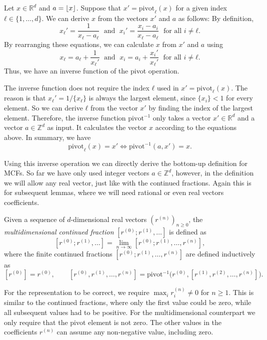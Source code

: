 Let $x ∈ ℝ^d$ and $a = \left\lfloor x\right\rfloor$.
Suppose that $x' = \mathrm{pivot}_ℓ(x)$ for a given index $ℓ ∈ \{1, …, d\}$.
We can derive $x$ from the vectors $x'$ and $a$ as follows:
By definition,
\[
  x_ℓ' = \frac{1}{x_ℓ - a_ℓ}
  \; \text{ and } \;
  x_i' = \frac{x_i - a_i}{x_ℓ - a_ℓ}
  \; \text{ for all } i ≠ ℓ.
\]
By rearranging these equations, we can calculate $x$ from $x'$ and $a$ using
\[
  x_ℓ = a_ℓ + \frac{1}{x_ℓ'}
  \; \text{ and } \;
  x_i = a_i + \frac{x_i'}{x_ℓ'}
  \; \text{ for all } i ≠ ℓ.
\]
Thus, we have an inverse function of the pivot operation.

The inverse function does not require the index $ℓ$ used in $x' = \mathrm{pivot}_ℓ(x)$.
The reason is that $x_ℓ' = 1/\{x_ℓ\}$ is always the largest element, since $\{x_i\} < 1$ for every element.
So we can derive $ℓ$ from the vector $x'$ by finding the index of the largest element.
Therefore, the inverse function $\mathrm{pivot}^{-1}$ only takes
a vector $x' ∈ ℝ^d$ and a vector $a ∈ ℤ^d$ as input.
It calculates the vector $x$ according to the equations above.
In summary, we have
\[
  \mathrm{pivot}_ℓ(x) = x' \iff \mathrm{pivot}^{-1}(a, x') = x.
\]

Using this inverse operation we can directly derive the bottom-up definition for MCFs.
So far we have only used integer vectors $a ∈ ℤ^d$,
however, in the definition we will allow any real vector, just like with the continued fractions.
Again this is for subsequent lemmas, where we will need rational or even real vectors coefficients.

\begin{definition}
  Given a sequence of $d$-dimensional real vectors $(r^{(n)})_{n ≥ 0}$,
  the \emph{multidimensional continued fraction} $[r^{(0)}; r^{(1)}, …]$ is defined as
  \[
    [r^{(0)}; r^{(1)}, …] = \lim_{n → ∞} [r^{(0)}; r^{(1)}, …, r^{(n)}],
  \]
  where the finite continued fractions $[r^{(0)}; r^{(1)}, …, r^{(n)}]$
  are defined inductively as
  \[
    [r^{(0)}] = r^{(0)},
    \qquad
    [r^{(0)}, r^{(1)}, …, r^{(n)}]
    = \mathrm{pivot}^{-1}\big(r^{(0)}, [r^{(1)}, r^{(2)}, …, r^{(n)}]\big).
  \]
\end{definition}

For the representation to be correct, we require $\max_i r_i^{(n)} ≠ 0$ for $n ≥ 1$.
This is similar to the continued fractions, where only the first value could be zero,
while all subsequent values had to be positive.
For the multidimensional counterpart we only require that the pivot element is not zero.
The other values in the coefficients $r^{(n)}$ can assume any non-negative value, including zero.

